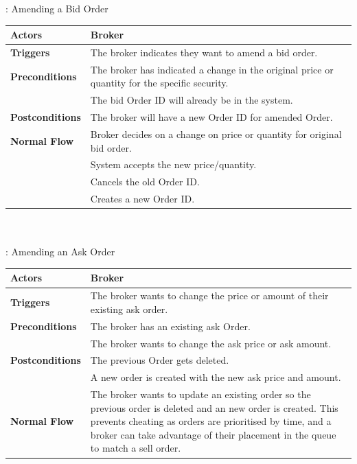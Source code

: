 \documentclass[a4paper]{article}
\begin{document}
: Amending a Bid Order \\ 
\begin{tabular}{ | l | p{10cm} |}\hline
	{\bf Actors} & Broker \\\hline
	{\bf Triggers} & The broker indicates they want to amend a bid order. \\\hline
	{\bf Preconditions} & The broker has indicated a change in the original price or quantity for the specific security. \\
	& The bid Order ID will already be in the system.  \\\hline
	{\bf Postconditions} & The broker will have a new Order ID for amended Order. \\\hline
	{\bf Normal Flow} & Broker decides on a change on price or quantity for original bid order. \\
	& System accepts the new price/quantity. \\
	& Cancels the old Order ID. \\
	& Creates a new Order ID. \\\hline
\end{tabular} \\\\

\newpage
{}: Amending an Ask Order \\ 
\begin{tabular}{ | l | p{10cm} |}\hline
	{\bf Actors} & Broker \\\hline
	{\bf Triggers} & The broker wants to change the price or amount of their existing ask order.  \\\hline
	{\bf Preconditions} & The broker has an existing ask Order. \\
	& The broker wants to change the ask price or ask amount. \\\hline
	{\bf Postconditions} & The previous Order gets deleted. \\
	& A new order is created with the new ask price and amount. \\\hline
	{\bf Normal Flow} & The broker wants to update an existing order so the previous order is deleted and an new order is created. This prevents cheating as orders are prioritised by time, and a broker can take advantage of their placement in the queue to match a sell order. \\\hline
\end{tabular} \\\\
\end{document}
